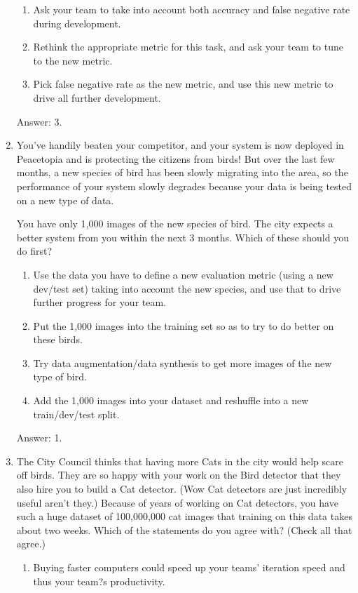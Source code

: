 \documentclass[12pt]{article}
\numberwithin{equation}{section}
\begin{document}
\begin{enumerate}
\begin{enumerate}
		\item Ask your team to take into account both accuracy and false negative rate during development.
		\item Rethink the appropriate metric for this task, and ask your team to tune to the new metric.
		\item Pick false negative rate as the new metric, and use this new metric to drive all further development.
	\end{enumerate} \par
	Answer: 3.
	\item You've handily beaten your competitor, and your system is now deployed in Peacetopia and is protecting the citizens from birds! But over the last few months, a new species of bird has been slowly migrating into the area, so the performance of your system slowly degrades because your data is being tested on a new type of data. \par
	You have only 1,000 images of the new species of bird. The city expects a better system from you within the next 3 months. Which of these should you do first?
	\begin{enumerate}
		\item Use the data you have to define a new evaluation metric (using a new dev/test set) taking into account the new species, and use that to drive further progress for your team.
		\item Put the 1,000 images into the training set so as to try to do better on these birds.
		\item Try data augmentation/data synthesis to get more images of the new type of bird.			\item Add the 1,000 images into your dataset and reshuffle into a new train/dev/test split.	\end{enumerate} \par
	Answer: 1.
	\item The City Council thinks that having more Cats in the city would help scare off birds. They are so happy with your work on the Bird detector that they also hire you to build a Cat detector. (Wow Cat detectors are just incredibly useful aren't they.) Because of years of working on Cat detectors, you have such a huge dataset of 100,000,000 cat images that training on this data takes about two weeks. Which of the statements do you agree with? (Check all that agree.)
	\begin{enumerate}
		\item Buying faster computers could speed up your teams' iteration speed and thus your team?s productivity.

\end{enumerate}
\end{enumerate}
\end{document}
